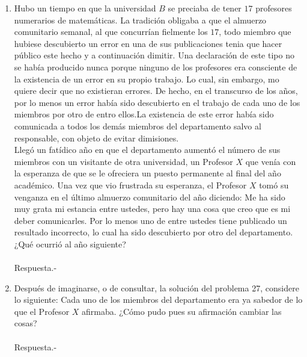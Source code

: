 \begin{enumerate}
       \item Hubo un tiempo en que la universidad $B$ se preciaba de tener $17$ profesores numerarios de matemáticas. La tradición obligaba a que el almuerzo comunitario semanal, al que concurrían fielmente los $17$, todo miembro que hubiese descubierto un error en una de sus publicaciones tenia que hacer público este hecho y a continuación dimitir. Una declaración de este tipo no se había producido nunca porque ninguno de los profesores era consciente de la existencia de un error en su propio trabajo. Lo cual, sin embargo, mo quiere decir que no existieran errores. De hecho, en el transcurso de los años, por lo menos un error había sido descubierto en el trabajo de cada uno de los miembros por otro de entro ellos.La existencia de este error había sido comunicada a todos los demás miembros del departamento salvo al responsable, con objeto de evitar dimisiones.\\
          Llegó un fatídico año en que el departamento aumentó el número de sus miembros con un visitante de otra universidad, un Profesor $X$ que venía con la esperanza de que se le ofreciera un puesto permanente al final del año académico. Una vez que vio frustrada su esperanza, el Profesor $X$ tomó su venganza en el último almuerzo comunitario del año diciendo: Me ha sido muy grata mi estancia entre ustedes, pero hay una cosa que creo que es mi deber comunicarles. Por lo menos uno de entre ustedes tiene publicado un resultado incorrecto, lo cual ha sido descubierto por otro del departamento. ¿Qué ocurrió al año siguiente?\\\\
          Respuesta.-\;

       \item Después de imaginarse, o de consultar, la solución del problema 27, considere lo siguiente: Cada uno de los miembros del departamento era ya sabedor de lo que el Profesor $X$ afirmaba. ¿Cómo pudo pues su afirmación cambiar las cosas?\\\\
          Respuesta.-\;

          

    \end{enumerate}
    
    
